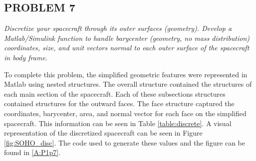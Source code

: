 \documentclass[12pt,a4paper,notitlepage]{article}
\begin{document}
\subsection{PROBLEM 7}
\textit{Discretize your spacecraft through its outer surfaces (geometry). Develop a Matlab/Simulink function to handle barycenter (geometry, no mass distribution) coordinates, size, and unit vectors normal to each outer surface of the spacecraft in body frame.}

To complete this problem, the simplified geometric features were represented in Matlab using nested structures. The overall structure contained the structures of each main section of the spacecraft. Each of these subsections structures contained structures for the outward faces. The face structure captured the coordinates, barycenter, area, and normal vector for each face on the simplified spacecraft. This information can be seen in Table \ref{table:discrete}. A visual representation of the discretized spacecraft can be seen in Figure \ref{fig:SOHO_disc}. The code used to generate these values and the figure can be found in \ref{A:P1p7}.
\end{document}
